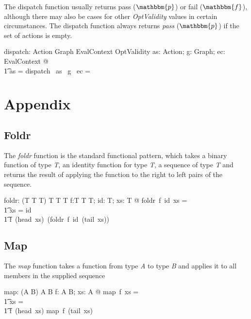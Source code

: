 \documentclass[fuzz]{llncs}
\def\pass{{\mathbbm{p}}}
\def\fail{{\mathbbm{f}}}
\def\zc{\textit}
\begin{document}
The dispatch function usually returns pass ($\pass$) or fail ($\fail$), although there may also be cases for other \zc{OptValidity} values in certain circumstances. The dispatch function
always returns \zc{pass} ($\pass$) if the set of actions is empty.
\begin{zed}
[Action]
\end{zed}
\begin{gendef}
   dispatch: \power Action \fun Graph \fun EvalContext \fun OptValidity
\where
   \forall as: \power Action; g: Graph; ec: EvalContext @ \\
\t1 as = \emptyset \implies dispatch~ as~ g ~ec = \pass
\end{gendef}


\section{Appendix}
\subsection{Foldr}
The \zc{foldr} function is the standard functional pattern, which takes a binary function
of type \zc{T}, an identity function for type \zc{T}, a sequence of type \zc{T} and returns
the result of applying the function to the right to left pairs of the sequence.
\begin{gendef}[T]
   foldr: (T \fun T \fun T) \fun T \fun \seq T \fun T
\where
   \forall f:T \fun T \fun T; id: T; xs: \seq T @ foldr~f~id~xs = \\
\t1 \IF xs = \langle \rangle \THEN id \\
\t1 \ELSE f~(head~xs)~(foldr~f~id~(tail~xs))
\end{gendef}

\subsection{Map}
The \zc{map} function takes a function from type \zc{A} to type \zc{B} and applies it to
all members in the supplied sequence
\begin{gendef}[A,B]
   map: (A \fun B) \fun \seq A \fun \seq B
\where
   \forall f: A \fun B; xs: \seq A @ map~f~xs = \\
\t1 \IF xs = \langle \rangle \THEN \langle \rangle \\
\t1 \ELSE \langle f~(head~xs) \rangle \cat map~f~(tail~xs)
\end{gendef}
\end{document}
